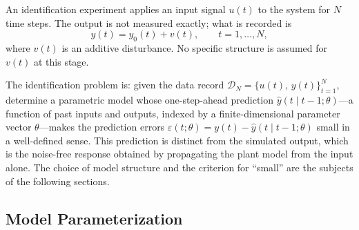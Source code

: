 \documentclass[acmsmall,screen,review]{acmart}
\begin{document}
An identification experiment applies an input signal $u(t)$ to the system for
$N$ time steps.  The output is not measured exactly; what is recorded is
\begin{equation}
    y(t) = y_0(t) + v(t), \qquad t = 1, \ldots, N,
    \label{eq:noisy-output}
\end{equation}
where $v(t)$ is an additive disturbance.  No specific structure is assumed for
$v(t)$ at this stage.

The identification problem is: given the data record
$\mathcal{D}_N = \{u(t),\,y(t)\}_{t=1}^{N}$, determine a parametric model
whose one-step-ahead prediction
$\hat{y}(t \mid t-1;\theta)$---a function of past inputs and outputs, indexed
by a finite-dimensional parameter vector $\theta$---makes the prediction
errors
$\varepsilon(t;\theta) = y(t) - \hat{y}(t \mid t-1;\theta)$ small in a
well-defined sense.  This prediction is distinct from the simulated output,
which is the noise-free response obtained by propagating the plant model from
the input alone.  The choice of model structure and the criterion for
``small'' are the subjects of the following sections.

\subsection{Model Parameterization}
\label{subsec:model-structures}
\end{document}
